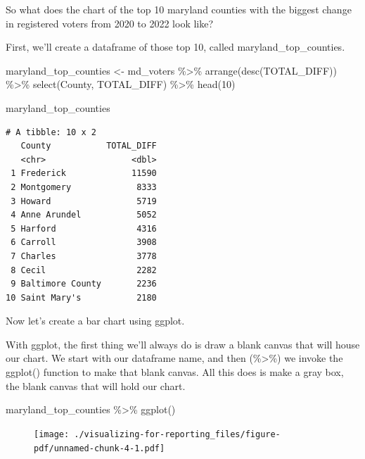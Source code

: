 \documentclass[
  letterpaper,
  DIV=11,
  numbers=noendperiod]{scrreprt}
\newenvironment{Shaded}{\begin{snugshade}}{\end{snugshade}}
\newcommand{\DecValTok}[1]{\textcolor[rgb]{0.68,0.00,0.00}{#1}}
\newcommand{\FunctionTok}[1]{\textcolor[rgb]{0.28,0.35,0.67}{#1}}
\newcommand{\NormalTok}[1]{\textcolor[rgb]{0.00,0.23,0.31}{#1}}
\newcommand{\OtherTok}[1]{\textcolor[rgb]{0.00,0.23,0.31}{#1}}
\newcommand{\SpecialCharTok}[1]{\textcolor[rgb]{0.37,0.37,0.37}{#1}}
\begin{document}
So what does the chart of the top 10 maryland counties with the biggest
change in registered voters from 2020 to 2022 look like?

First, we'll create a dataframe of those top 10, called
maryland\_top\_counties.

\begin{Shaded}
\begin{Highlighting}[]
\NormalTok{maryland\_top\_counties }\OtherTok{\textless{}{-}}\NormalTok{ md\_voters }\SpecialCharTok{\%\textgreater{}\%}
  \FunctionTok{arrange}\NormalTok{(}\FunctionTok{desc}\NormalTok{(TOTAL\_DIFF)) }\SpecialCharTok{\%\textgreater{}\%}
  \FunctionTok{select}\NormalTok{(County, TOTAL\_DIFF) }\SpecialCharTok{\%\textgreater{}\%} 
  \FunctionTok{head}\NormalTok{(}\DecValTok{10}\NormalTok{)}

\NormalTok{maryland\_top\_counties}
\end{Highlighting}
\end{Shaded}

\begin{verbatim}
# A tibble: 10 x 2
   County           TOTAL_DIFF
   <chr>                 <dbl>
 1 Frederick             11590
 2 Montgomery             8333
 3 Howard                 5719
 4 Anne Arundel           5052
 5 Harford                4316
 6 Carroll                3908
 7 Charles                3778
 8 Cecil                  2282
 9 Baltimore County       2236
10 Saint Mary's           2180
\end{verbatim}

Now let's create a bar chart using ggplot.

With ggplot, the first thing we'll always do is draw a blank canvas that
will house our chart. We start with our dataframe name, and then
(\%\textgreater\%) we invoke the ggplot() function to make that blank
canvas. All this does is make a gray box, the blank canvas that will
hold our chart.

\begin{Shaded}
\begin{Highlighting}[]
\NormalTok{maryland\_top\_counties }\SpecialCharTok{\%\textgreater{}\%}
  \FunctionTok{ggplot}\NormalTok{()}
\end{Highlighting}
\end{Shaded}

\begin{figure}[H]

{\centering \texttt{[image: ./visualizing-for-reporting\_files/figure-pdf/unnamed-chunk-4-1.pdf]}

}

\end{figure}
\end{document}
